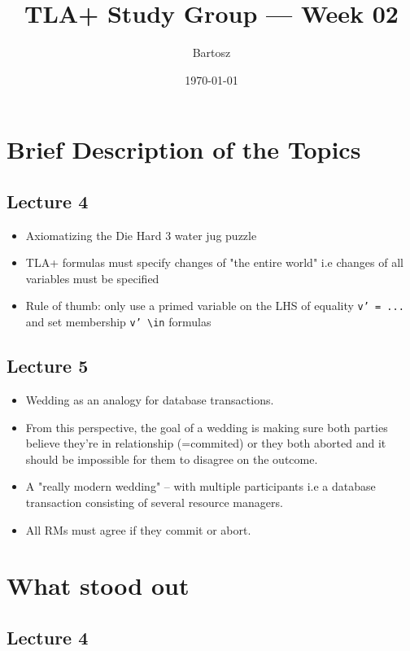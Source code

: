 \documentclass[11pt]{article}
\title{TLA+ Study Group — Week 02}
\author{Bartosz}
\date{\today}
\begin{document}
\maketitle

\section*{Brief Description of the Topics}
\subsection*{Lecture 4}

\begin{itemize}
  \item { Axiomatizing the Die Hard 3 water jug puzzle }
  \item { TLA+ formulas must specify changes of "the entire world" i.e changes
  of all variables must be specified }
  \item { Rule of thumb: only use a primed variable on the LHS of equality
  \texttt{v' = ...} and set membership \texttt{v' \textbackslash in} formulas }
\end{itemize}

\subsection*{Lecture 5}

\begin{itemize}
  \item { Wedding as an analogy for database transactions. }
  \item { From this perspective, the goal of a wedding is making sure both
  parties believe they're in relationship (=commited) or they both aborted and
  it should be impossible for them to disagree on the outcome. }
  \item { A "really modern wedding" -- with multiple participants i.e a database
  transaction consisting of several resource managers. }
  \item { All RMs must agree if they commit or abort. }
\end{itemize}

\section*{What stood out}

\subsection*{Lecture 4}
\end{document}
